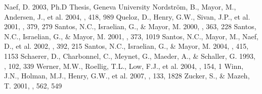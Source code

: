 \documentclass{aa}
\begin{document}
\begin{thebibliography}{}
{
   Naef, D. 2003, Ph.D Thesis, Geneva University
   Nordstr\"om, B., Mayor, M., Andersen, J., et al. 2004, \aap, 418, 989
   Queloz, D., Henry, G.W., Sivan, J.P., et al. 2001, \aap, 379, 279
   Santos, N.C., Israelian, G., \& Mayor, M. 2000, \aap, 363, 228
   Santos, N.C., Israelian, G., \& Mayor, M. 2001, \aap, 373, 1019
   Santos, N.C., Mayor, M., Naef, D., et al. 2002, \aap, 392, 215
   Santos, N.C., Israelian, G., \& Mayor, M. 2004, \aap, 415, 1153
   Schaerer, D., Charbonnel, C., Meynet, G., Maeder, A., \& Schaller, G.
   1993, \aaps, 102, 339
   Werner, M.W., Roellig, T.L., Low, F.J., et al. 2004, \apjs, 154, 1
   Winn, J.N., Holman, M.J., Henry, G.W., et al. 2007, \apj, 133, 1828
   Zucker, S., \& Mazeh, T. 2001, \apj, 562, 549
}
\end{thebibliography}
 
\end{document}

